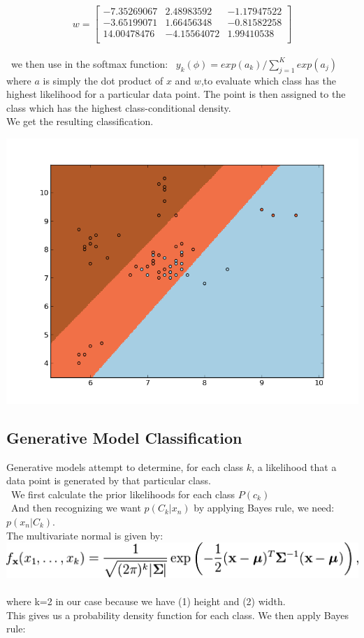 \documentclass[11pt, oneside]{article}   	%
\begin{document}
\[
w=
  \begin{bmatrix}
    -7.35269067 & 2.48983592 & -1.17947522\\
    -3.65199071 & 1.66456348 & -0.81582258\\
    14.00478476 & -4.15564072 & 1.99410538\\	
	
  \end{bmatrix}
\]
\\
\
 we then use in the softmax function:
\
$y_k(\phi) = exp(a_k)/\sum\limits_{j=1}^K exp(a_j)$
\\
where $a$ is simply the dot product of $x$ and $w$,to evaluate which class has the highest likelihood for a particular data point. The point is then assigned to the class which has the highest class-conditional density.
\\
We get the resulting classification.
\begin{center}
  \includegraphics[scale=.55]{logistic_classifer}
\end{center}


\subsection*{Generative Model Classification}

Generative models attempt to determine, for each class $k$, a likelihood that a data point is generated by that particular class.
\\
\ We first calculate the prior likelihoods for each class $P(c_k)$
\\
\ And then recognizing we want $p(C_k |x_n)$ by applying Bayes rule, we need: $p(x_n |C_k)$.
\\
The multivariate normal is given by:
\
\\
\includegraphics[scale=.5]{formula}
\
\\
where k=2 in our case because we have (1) height and (2) width.
\
\\
This gives us a probability density function for each class. We then apply Bayes rule:
\end{document}
